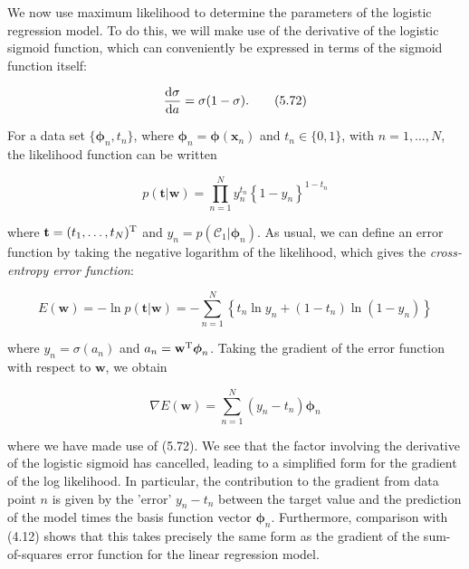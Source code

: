 \documentclass{article}
\begin{document}
We now use maximum likelihood to determine the parameters of the logistic regression model. To do this, we will make use of the derivative of the logistic sigmoid function, which can conveniently be expressed in terms of the sigmoid function itself:

\begin{equation}
\frac{{\rm d}\sigma}{{\rm d}a}=\sigma(1-\sigma).
\tag{5.72}
\end{equation}

For a data set $\{\boldsymbol{\phi}_{n},t_{n}\}$, where $\boldsymbol{\phi}_{n}=\boldsymbol{\phi}(\mathbf{x}_{n})$ and $t_{n}\in\{0,1\}$, with $n=1,\ldots,N$, the likelihood function can be written

\begin{equation}
p(\mathbf{t}|\mathbf{w})=\prod_{n=1}^{N}y_{n}^{t_{n}}\left\{1-y_{n}\right\}^{1-t_{n}}
\tag{5.73}
\end{equation}

where $\mathbf{t}=(t_{1},\ldots,t_{N})^{\rm T}$ and $y_{n}=p(\mathcal{C}_{1}|\boldsymbol{\phi}_{n})$. As usual, we can define an error function by taking the negative logarithm of the likelihood, which gives the \textit{cross-entropy error function}:

\begin{equation}
E(\mathbf{w})=-\ln p(\mathbf{t}|\mathbf{w})=-\sum_{n=1}^{N}\left\{t_{n}\ln y_{n}+(1-t_{n})\ln(1-y_{n})\right\}
\tag{5.74}
\end{equation}

where $y_{n}=\sigma(a_{n})$ and $a_{n}=\mathbf{w}^{\rm T}\boldsymbol{\phi}_{n}$. Taking the gradient of the error function with respect to $\mathbf{w}$, we obtain

\begin{equation}
\nabla E(\mathbf{w})=\sum_{n=1}^{N}(y_{n}-t_{n})\boldsymbol{\phi}_{n}
\tag{5.75}
\end{equation}

where we have made use of (5.72). We see that the factor involving the derivative of the logistic sigmoid has cancelled, leading to a simplified form for the gradient of the log likelihood. In particular, the contribution to the gradient from data point $n$ is given by the 'error' $y_{n}-t_{n}$ between the target value and the prediction of the model times the basis function vector $\boldsymbol{\phi}_{n}$. Furthermore, comparison with (4.12) shows that this takes precisely the same form as the gradient of the sum-of-squares error function for the linear regression model.
\end{document}
